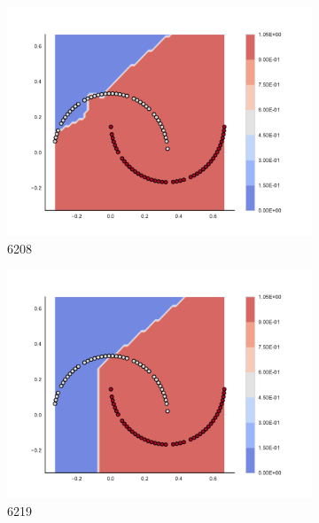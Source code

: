 \begin{figure}[h]
\begin{subfigure}[b]{0.09\textwidth}
    \includegraphics[clip, trim=2.35cm 1.75cm 4.5cm 0cm,width=\textwidth]{img/convergence/6208.pdf}
    \caption{6208}
    \label{fig:convergence_6208}
\end{subfigure}
%
\begin{subfigure}[b]{0.09\textwidth}
    \includegraphics[clip, trim=2.35cm 1.75cm 4.5cm 0cm,width=\textwidth]{img/convergence/6219.pdf}
    \caption{6219}
    \label{fig:convergence_6219}
\end{subfigure}
%
\begin{subfigure}[b]{0.09\textwidth}

\end{subfigure}
\end{figure}
